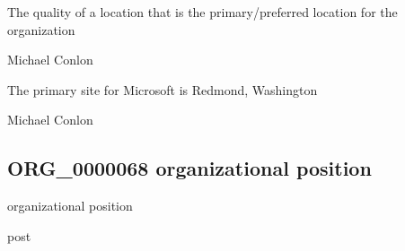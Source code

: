 \documentclass[letterpaper,10pt,english]{sphinxmanual}
\begin{document}
\begin{sphinxShadowBox}

\sphinxAtStartPar
The quality of a location that is the primary/preferred location for the organization
\end{sphinxShadowBox}

\begin{sphinxShadowBox}

\sphinxAtStartPar
Michael Conlon 
\end{sphinxShadowBox}

\begin{sphinxShadowBox}

\sphinxAtStartPar
The primary site for Microsoft is Redmond, Washington
\end{sphinxShadowBox}

\begin{sphinxShadowBox}

\sphinxAtStartPar
Michael Conlon 
\end{sphinxShadowBox}
\begin{quote}

\ignorespaces \end{quote}


\subsection{ORG\_0000068 \sphinxhyphen{} organizational position}
\label{\detokenize{doc-ORG_0000068:org-0000068-organizational-position}}\label{\detokenize{doc-ORG_0000068:index-0}}\label{\detokenize{doc-ORG_0000068::doc}}
\begin{sphinxShadowBox}

\sphinxAtStartPar
organizational position
\end{sphinxShadowBox}

\begin{sphinxShadowBox}

\sphinxAtStartPar
post
\end{sphinxShadowBox}
\end{document}
